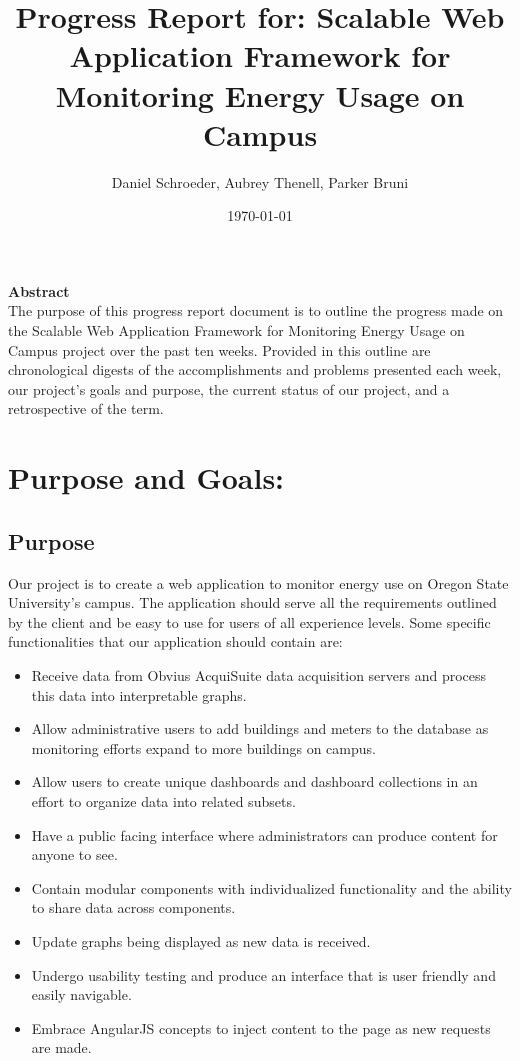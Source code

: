 \documentclass[journal,10pt,onecolumn,compsoc]{IEEEtran} \usepackage[margin=1.0in]{geometry} \usepackage{pdfpages}
\title{Progress Report for: \linebreak Scalable Web Application Framework for Monitoring Energy Usage on Campus}
\author{Daniel Schroeder, Aubrey Thenell, Parker Bruni}
\date{\today}
\begin{document}
     \maketitle
     \vspace{2cm}
     \begin{center}
     \noindent \textbf{Abstract} \\
                 \indent The purpose of this progress report document is to outline the progress made on the Scalable Web Application Framework for Monitoring Energy Usage on Campus project over the past ten weeks. Provided in this outline are chronological digests of the accomplishments and problems presented each week, our project's goals and purpose, the current status of our project, and a retrospective of the term. 
     \end{center}         
     
     \newpage
    \tableofcontents
    \newpage
    \section{Purpose and Goals:}
    \subsection{Purpose} 
    Our project is to create a web application to monitor energy use on Oregon State University's campus. The application should serve all the requirements outlined by the client and be easy to use for users of all experience levels.
    \noindent Some specific functionalities that our application should contain are:
    \begin{itemize}
        \item Receive data from Obvius AcquiSuite data acquisition servers and process this data into interpretable graphs.
        \item Allow administrative users to add buildings and meters to the database as monitoring efforts expand to more buildings on campus.
        \item Allow users to create unique dashboards and dashboard collections in an effort to organize data into related subsets.
        \item Have a public facing interface where administrators can produce content for anyone to see.
        \item Contain modular components with individualized functionality and the ability to share data across components.
        \item Update graphs being displayed as new data is received.
        \item Undergo usability testing and produce an interface that is user friendly and easily navigable.
        \item Embrace AngularJS concepts to inject content to the page as new requests are made.
    \end{itemize}
    
\end{document}

